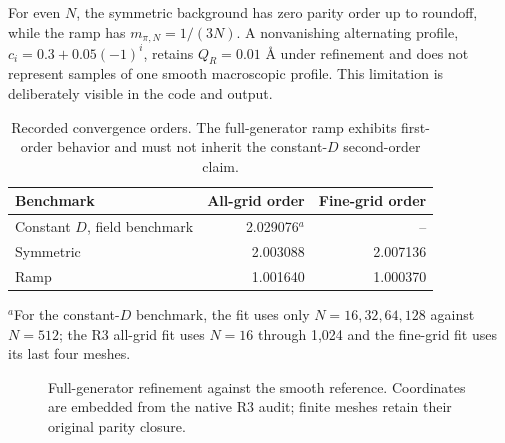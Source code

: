 \documentclass[11pt,a4paper]{article}
\begin{document}
For even $N$, the symmetric background has zero parity order up to roundoff, while the ramp has $m_{\pi,N}=1/(3N)$. A nonvanishing alternating profile, $c_i=0.3+0.05(-1)^i$, retains $Q_R=0.01$ \AA{} under refinement and does not represent samples of one smooth macroscopic profile. This limitation is deliberately visible in the code and output.

\begin{table}[htbp]\centering\small
\caption{Recorded convergence orders. The full-generator ramp exhibits first-order behavior and must not inherit the constant-$D$ second-order claim.}
\label{tab:orders}
\begin{tabular}{lrr}
\toprule
Benchmark & All-grid order & Fine-grid order \\
\midrule
Constant $D$, field benchmark & 2.029076$^{a}$ & -- \\
Symmetric & 2.003088 & 2.007136 \\
Ramp & 1.001640 & 1.000370 \\
\bottomrule
\end{tabular}
\par\smallskip\footnotesize $^a$For the constant-$D$ benchmark, the fit uses only $N=16,32,64,128$ against $N=512$; the R3 all-grid fit uses $N=16$ through 1,024 and the fine-grid fit uses its last four meshes.
\end{table}

\begin{figure}[htbp]\centering
{}
\caption{Full-generator refinement against the smooth reference. Coordinates are embedded from the native R3 audit; finite meshes retain their original parity closure.}
\label{fig:refinement}
\end{figure}
\end{document}
